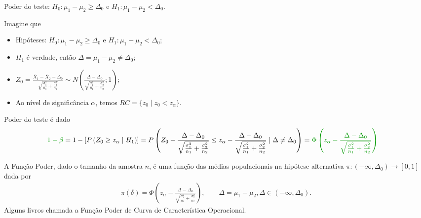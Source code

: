 \documentclass[9pt]{beamer}
\begin{document}
\begin{frame}{Poder do teste: $H_0:\mu_1 - \mu_2 \geq \Delta_0$ e $H_1: \mu_1 - \mu_2 < \Delta_0$.}

\tiny

Imagine que
\begin{itemize}
	\item Hipóteses: $H_0: \mu_1 - \mu_2 \geq \Delta_0$ e $H_1: \mu_1 -  \mu_2 < \Delta_0$;
	\item $H_1$ é verdade, então $\Delta = \mu_1-\mu_2 \neq \Delta_0$;
	\item $Z_0 = \frac{\bar{X}_1 - \bar{X}_2 - \Delta_0}{ \sqrt{ \frac{\sigma_1^2}{n_1} + \frac{\sigma_2^2}{n_2} } } \sim N\left( \frac{\Delta - \Delta_0}{ \sqrt{ \frac{\sigma_1^2}{n_1} + \frac{\sigma_2^2}{n_2} } } ; 1\right)$;
	\item Ao nível de significância $\alpha$, temos $RC = \{ z_0 \mid z_0 < z_{\alpha}  \}$.
\end{itemize}
\vfill	

Poder do teste é dado
\begin{align*}
\textcolor{important}{1-\beta} &=1 - \left[P\left( Z_0 \geq z_{\alpha} \mid H_1 \right)\right] =  P \left( Z_0 - \frac{\Delta - \Delta_0}{ \sqrt{ \frac{\sigma_1^2}{n_1} + \frac{\sigma_2^2}{n_2} } } \leq z_{\alpha} - \frac{\Delta - \Delta_0}{ \sqrt{ \frac{\sigma_1^2}{n_1} + \frac{\sigma_2^2}{n_2} } } \mid \Delta \neq \Delta_0 \right)= \textcolor{important}{\Phi\left( z_{\alpha} - \frac{\Delta - \Delta_0}{ \sqrt{ \frac{\sigma_1^2}{n_1} + \frac{\sigma_2^2}{n_2} } } \right) }
\end{align*}
\vfill

A \textcolor{important}{Função Poder}, dado o tamanho da amostra $n$, é uma função das médias populacionais na hipótese alternativa  $\pi: (-\infty, \Delta_0) \longrightarrow [0,1]$ dada por
\begin{align*}
\pi(\delta) = \Phi\left( z_{\alpha} - \frac{\Delta - \Delta_0}{ \sqrt{ \frac{\sigma_1^2}{n_1} + \frac{\sigma_2^2}{n_2} } } \right), \qquad \Delta = \mu_1 - \mu_2, \Delta \in (-\infty, \Delta_0).
\end{align*}
Alguns livros chamada a Função Poder de \textcolor{important}{Curva de Característica Operacional.}

\normalsize

\end{frame}
\end{document}
